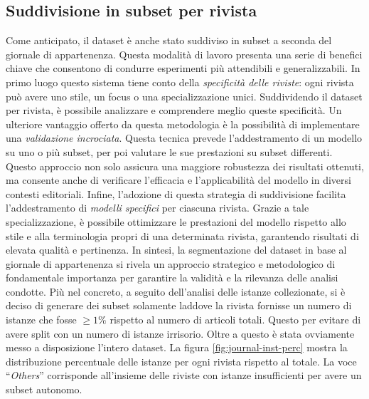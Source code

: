 \documentclass[12pt,a4paper,twoside,openright]{book}
\begin{document}
\subsection{Suddivisione in subset per rivista}
Come anticipato, il dataset è anche stato suddiviso in subset a seconda del giornale di appartenenza. Questa modalità di lavoro presenta una serie di benefici chiave che consentono di condurre esperimenti più attendibili e generalizzabili. 
In primo luogo questo sistema tiene conto della \emph{specificità delle riviste}: ogni rivista può avere uno stile, un focus o una specializzazione unici. Suddividendo il dataset per rivista, è possibile analizzare e comprendere meglio queste specificità. Un ulteriore vantaggio offerto da questa metodologia è la possibilità di implementare una \emph{validazione incrociata}. Questa tecnica prevede l'addestramento di un modello su uno o più subset, per poi valutare le sue prestazioni su subset differenti. Questo approccio non solo assicura una maggiore robustezza dei risultati ottenuti, ma consente anche di verificare l'efficacia e l'applicabilità del modello in diversi contesti editoriali.
Infine, l'adozione di questa strategia di suddivisione facilita l'addestramento di \emph{modelli specifici} per ciascuna rivista. Grazie a tale specializzazione, è possibile ottimizzare le prestazioni del modello rispetto allo stile e alla terminologia propri di una determinata rivista, garantendo risultati di elevata qualità e pertinenza.
In sintesi, la segmentazione del dataset in base al giornale di appartenenza si rivela un approccio strategico e metodologico di fondamentale importanza per garantire la validità e la rilevanza delle analisi condotte.
Più nel concreto, a seguito dell'analisi delle istanze collezionate, si è deciso di generare dei subset solamente laddove la rivista fornisse un numero di istanze che fosse $\geq 1\%$ rispetto al numero di articoli totali. Questo per evitare di avere split con un numero di istanze irrisorio. Oltre a questo è stata ovviamente messo a disposizione l'intero dataset. 
La figura \ref{fig:journal-inst-perc} mostra la distribuzione percentuale delle istanze per ogni rivista rispetto al totale. La voce ``\emph{Others}'' corrisponde all'insieme delle riviste con istanze insufficienti per avere un subset autonomo.
\end{document}
